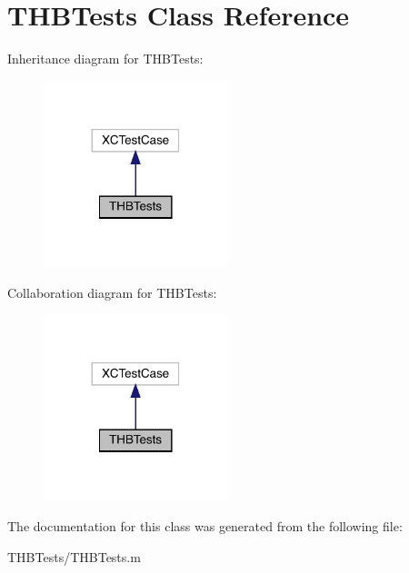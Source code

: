 \hypertarget{interface_t_h_b_tests}{}\section{T\+H\+B\+Tests Class Reference}
\label{interface_t_h_b_tests}


Inheritance diagram for T\+H\+B\+Tests\+:\nopagebreak
\begin{figure}[H]
\begin{center}
\leavevmode
\includegraphics[width=152pt]{interface_t_h_b_tests__inherit__graph}
\end{center}
\end{figure}


Collaboration diagram for T\+H\+B\+Tests\+:\nopagebreak
\begin{figure}[H]
\begin{center}
\leavevmode
\includegraphics[width=152pt]{interface_t_h_b_tests__coll__graph}
\end{center}
\end{figure}


The documentation for this class was generated from the following file\+:\begin{DoxyCompactItemize}
\item 
T\+H\+B\+Tests/T\+H\+B\+Tests.\+m\end{DoxyCompactItemize}
